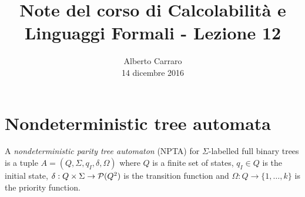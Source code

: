 \documentclass[runningheads,a4paper]{llncs}
\begin{document}
\mainmatter  %

\title{Note del corso di Calcolabilit\`{a} e Linguaggi Formali - Lezione 12}


%
%
\author{Alberto Carraro \\ 14 dicembre 2016}
%


%
%




\maketitle

\section{Nondeterministic tree automata}

\begin{definition}\label{def:NDPTA}
A \emph{nondeterministic parity tree automaton} (NPTA) for $\Sigma$-labelled full binary trees is a tuple $A = (Q, \Sigma, q_I, \delta, \Omega)$
 where $Q$ is a finite set of states, $q_I \in Q$ is the initial state, $\delta: Q \times \Sigma \to \mathcal{P}(Q^2)$ is the transition function and $\Omega: Q \to \{1,\ldots, k\}$ is the priority function.
\end{definition}
\end{document}

